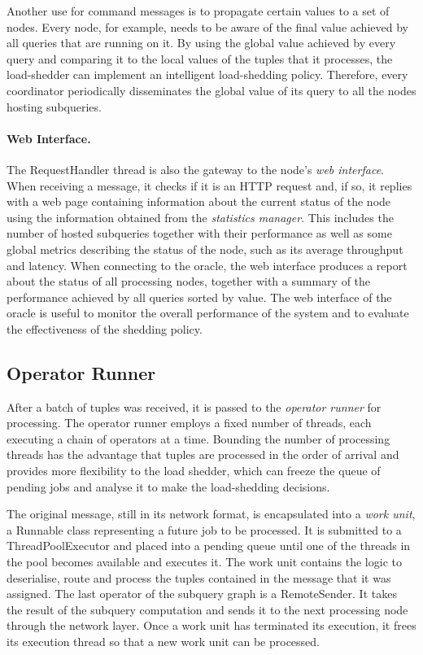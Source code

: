 Another use for command messages is to propagate certain values to a set of nodes. Every node, for
example, needs to be aware of the final \sic value achieved by all queries that are running on it.
By using the global \sic value achieved by every query and comparing it to the local values of the tuples
that it processes, the load-shedder can implement an intelligent load-shedding policy. Therefore, every
coordinator periodically disseminates the global \sic value of its query to all the nodes hosting subqueries.
\vspace{-10pt}
\paragraph{Web Interface.}
The RequestHandler thread is also the gateway to the node's \emph{web interface}. When receiving a
message, it checks if it is an HTTP request and, if so, it replies with a web page containing information
about the current status of the node using the information obtained from the \emph{statistics manager}.
This includes the number of hosted subqueries together with their performance as well as some global
metrics describing the status of the node, such as its average throughput and latency.
When connecting to the oracle, the web interface produces a report about the status of all processing
nodes, together with a summary of the performance achieved by all queries sorted by \sic value. The web
interface of the oracle is useful to monitor the overall performance of the system and to evaluate the
effectiveness of the shedding policy. 

\subsection*{Operator Runner}
After a batch of tuples was received, it is passed to the \emph{operator runner} for processing.
The operator runner employs a fixed number of threads, each
executing a chain of operators at a time. Bounding the number of processing threads has the
advantage that tuples are processed in the order of arrival and provides more flexibility to the load
shedder, which can freeze the queue of pending jobs and analyse it to make the load-shedding decisions.

The original message, still in its network format, is encapsulated into a \emph{work unit}, a Runnable
class representing a future job to be processed. It is submitted to a ThreadPoolExecutor and placed into
a pending queue until one of the threads in the pool becomes available and executes it. The work unit
contains the logic to deserialise, route and process the tuples contained in the message that it was
assigned. The last operator of the subquery graph is a RemoteSender. It takes the result of
the subquery computation and sends it to the next processing node through the network layer. Once a work
unit has terminated its execution, it frees its execution thread so that a new work unit
can be processed.
\vspace{-10pt}
